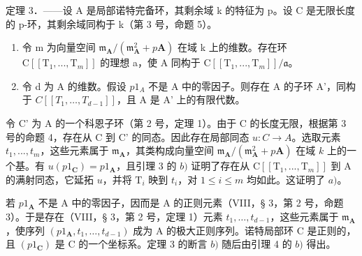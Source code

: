 定理 3．——设 A 是局部诺特完备环，其剩余域 k 的特征为 p。设 C 是无限长度的 p-环，其剩余域同构于 k（第 3 号，命题 5）。

\begin{enumerate}
\def\labelenumi{\alph{enumi})}
\item
  令 m 为向量空间 \(\mathfrak{m}_{\mathbf{A}}/(\mathfrak{m}_{\mathbf{A}}^{2} + p\mathbf{A})\) 在域 k 上的维数。存在环 \(\mathrm{C}[[\mathrm{T}_{1}, ..., \mathrm{T}_{m}]]\) 的理想 a，使 A 同构于 \(\mathrm{C}[[\mathrm{T}_{1}, ..., \mathrm{T}_{m}]]/\mathfrak{a}\)。
\item
  令 d 为 A 的维数。假设 \(p1_{A}\) 不是 A 中的零因子。则存在 A 的子环 A'，同构于 \(C[[T_{1}, \ldots, T_{d-1}]]\)，且 A 是 A' 上的有限代数。
\end{enumerate}

令 C' 为 A 的一个科恩子环（第 2 号，定理 1）。由于 C 的长度无限，根据第 3 号的命题 4，存在从 C 到 C' 的同态。因此存在局部同态 \(u:C\to A\)。选取元素 \(t_{1},...,t_{m}\)，这些元素属于 \(\mathfrak{m}_{\mathbf{A}}\)，其类构成向量空间 \(\mathfrak{m}_{\mathbf{A}}/(\mathfrak{m}_{\mathbf{A}}^{2}+p\mathbf{A})\) 在域 \(k\) 上的一个基。有 \(u(p1_{\mathbf{C}})=p1_{\mathbf{A}}\)，且引理 3 的 \(b)\) 证明了存在从 \(\mathrm{C}[[\mathrm{T}_{1},..., \mathrm{T}_{m}]]\) 到 A 的满射同态，它延拓 \(u\)，并将 \(\mathrm{T}_{i}\) 映到 \(t_{i}\)，对 \(1\leqslant i\leqslant m\) 均如此。这证明了 \(a)\)。

若 \(p1_{\mathbf{A}}\) 不是 A 中的零因子，因而是 A 的正则元素（VIII，§ 3，第 2 号，命题 3）。于是存在（VIII，§ 3，第 2 号，定理 1）元素 \(t_1, \ldots, t_{d-1}\)，这些元素属于 \(\mathfrak{m}_{\mathbf{A}}\)，使序列 \((p1_{\mathbf{A}}, t_1, \ldots, t_{d-1})\) 成为 A 的极大正则序列。诺特局部环 C 是正则的，且 \((p1_{\mathbf{C}})\) 是 C 的一个坐标系。定理 3 的断言 \(b)\) 随后由引理 4 的 \(b)\) 得出。

